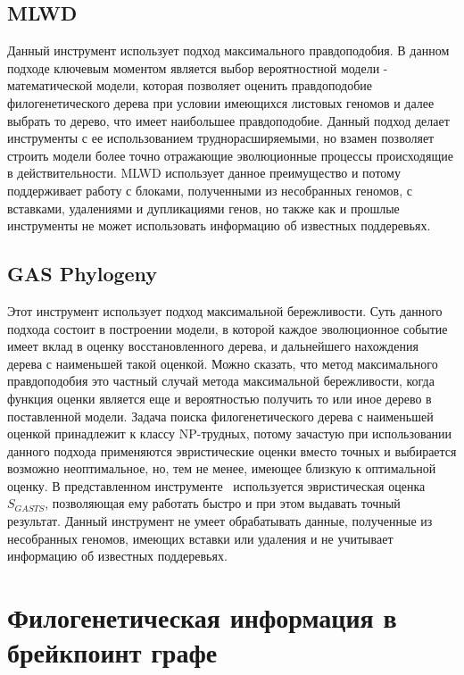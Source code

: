 \subsection{MLWD~\cite{hu2014mlgo}}
Данный инструмент использует подход максимального правдоподобия.
В данном подходе ключевым моментом является выбор вероятностной модели - математической модели,
которая позволяет оценить правдоподобие филогенетического дерева при условии имеющихся листовых геномов
и далее выбрать то дерево, что имеет наибольшее правдоподобие.
Данный подход делает инструменты с ее использованием труднорасширяемыми,
но взамен позволяет строить модели более точно отражающие эволюционные процессы происходящие в действительности.
MLWD использует данное преимущество и потому поддерживает работу с блоками, полученными из несобранных геномов,
с вставками, удалениями и дупликациями генов, но также как
и прошлые инструменты не может использовать информацию об известных поддеревьях.

\subsection{GAS Phylogeny}
Этот инструмент использует подход максимальной бережливости.
Суть данного подхода состоит в построении модели,
в которой каждое эволюционное событие имеет вклад в оценку восстановленного дерева, и дальнейшего нахождения дерева с наименьшей такой оценкой.
Можно сказать, что метод максимального правдоподобия это частный случай метода максимальной бережливости, когда функция оценки является
еще и вероятностью получить то или иное дерево в поставленной модели.
Задача поиска филогенетического дерева с наименьшей оценкой принадлежит к классу NP-трудных, потому зачастую при использовании данного подхода
применяются эвристические оценки вместо точных и выбирается возможно неоптимальное, но, тем не менее, имеющее близкую к оптимальной оценку.
В представленном инструменте~\cite{xu2011gasts} используется эвристическая оценка $S_{GASTS}$, позволяющая ему работать быстро и при этом выдавать точный результат.
Данный инструмент не умеет обрабатывать данные, полученные из несобранных геномов, имеющих вставки или удаления и не учитывает информацию об
известных поддеревьях.

\section{Филогенетическая информация в брейкпоинт графе}

